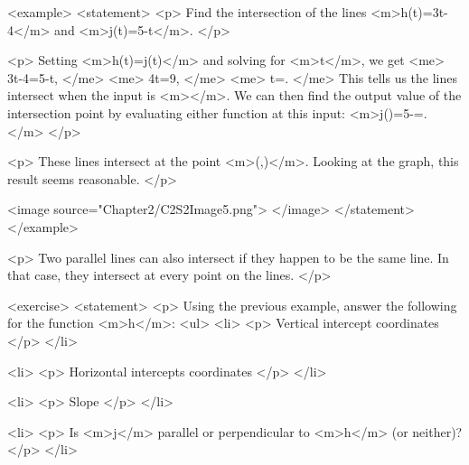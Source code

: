         <example>
            <statement>
                <p>
                    Find the intersection of the lines <m>h(t)=3t-4</m> and <m>j(t)=5-t</m>.
                </p>

                <p>
                    Setting <m>h(t)=j(t)</m> and solving for <m>t</m>, we get
                    <me>
                        3t-4=5-t,
                    </me>
                    <me>
                        4t=9,
                    </me>
                    <me>
                        t=.
                    </me>
                    This tells us the lines intersect when the input is <m></m>.
                    We can then find the output value of the intersection point by evaluating either function at this input: <m>j()=5-=.</m>
                </p>

                <p>
                    These lines intersect at the point <m>(,)</m>.
                    Looking at the graph, this result seems reasonable.
                </p>

                <image source="Chapter2/C2S2Image5.png">
                </image>
            </statement>
        </example>

        <p>
            Two parallel lines can also intersect if they happen to be the same line.
            In that case, they intersect at every point on the lines.
        </p>

        <exercise>
            <statement>
                <p>
                    Using the previous example, answer the following for the function <m>h</m>:
                    <ul>
                        <li>
                            <p>
                                Vertical intercept coordinates
                            </p>
                        </li>

                        <li>
                            <p>
                                Horizontal intercepts coordinates
                            </p>
                        </li>

                        <li>
                            <p>
                                Slope
                            </p>
                        </li>

                        <li>
                            <p>
                                Is <m>j</m> parallel or perpendicular to <m>h</m> (or neither)?
                            </p>
                        </li>

